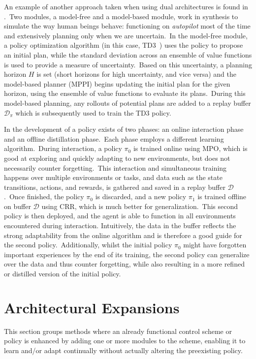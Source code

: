 An example of another approach taken when using dual architectures is found in \textcite{Lu2019}.\ Two modules, a model-free and a model-based module, work in synthesis to simulate the way human beings behave: functioning on \emph{autopilot} most of the time and extensively planning only when we are uncertain.\ In the model-free module, a policy optimization algorithm (in this case, TD3~\cite{Fujimoto2018}) uses the policy to propose an initial plan, while the standard deviation across an ensemble of value functions is used to provide a measure of uncertainty.\ Based on this uncertainty, a planning horizon $H$ is set (short horizons for high uncertainty, and vice versa) and the model-based planner (MPPI) begins updating the initial plan for the given horizon, using the ensemble of value functions to evaluate its plans.\ During this model-based planning, any rollouts of potential plans are added to a replay buffer $\mathcal{D}_{\pi}$ which is subsequently used to train the TD3 policy.

In \textcite{Zhou2022} the development of a policy exists of two phases: an online interaction phase and an offline distillation phase.\ Each phase employs a different learning algorithm.\ During interaction, a policy $\pi_0$ is trained online using MPO, which is good at exploring and quickly adapting to new environments, but does not necessarily counter forgetting.\ This interaction and simultaneous training happens over multiple environments or tasks, and data such as the state transitions, actions, and rewards, is gathered and saved in a replay buffer $\mathcal{D}$.\ Once finished, the policy $\pi_0$ is discarded, and a new policy $\pi_1$ is trained offline on buffer $\mathcal{D}$ using CRR, which is much better for generalization.\ This second policy is then deployed, and the agent is able to function in all environments encountered during interaction.
Intuitively, the data in the buffer reflects the strong adaptability from the online algorithm and is therefore a good guide for the second policy.\ Additionally, whilst the initial policy $\pi_0$ might have forgotten important experiences by the end of its training, the second policy can generalize over the data and thus counter forgetting, while also resulting in a more refined or distilled version of the initial policy.


\section{Architectural Expansions}\label{sec:expansions}
This section groups methods where an already functional control scheme or policy is enhanced by adding one or more modules to the scheme, enabling it to learn and/or adapt continually without actually altering the preexisting policy.\

